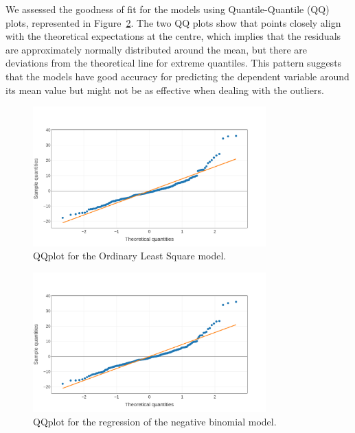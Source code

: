 \documentclass[11pt,letterpaper]{article}
\begin{document}
We assessed the goodness of fit for the models using Quantile-Quantile (QQ) plots, represented in Figure~\ref{fig:qqplot-neg}. The two QQ plots show that points closely align with the theoretical expectations at the centre, which implies that the residuals are approximately normally distributed around the mean, but there are deviations from the theoretical line for extreme quantiles. This pattern suggests that the models have good accuracy for predicting the dependent variable around its mean value but might not be as effective when dealing with the outliers.

\begin{figure}[H]
\centering
\includegraphics[width=0.8\textwidth]{figs/appendix/regression/qqplot.png}
\caption{QQplot for the Ordinary Least Square model.}
\hfill
\label{fig:qqplot-ols}
\end{figure}    
\begin{figure}[H]
\includegraphics[width=0.8\textwidth]{figs/appendix/regression/qqplotneg.png}
\caption{QQplot for the regression of the negative binomial model.}
\label{fig:qqplot-neg}
\end{figure}

\end{document}
